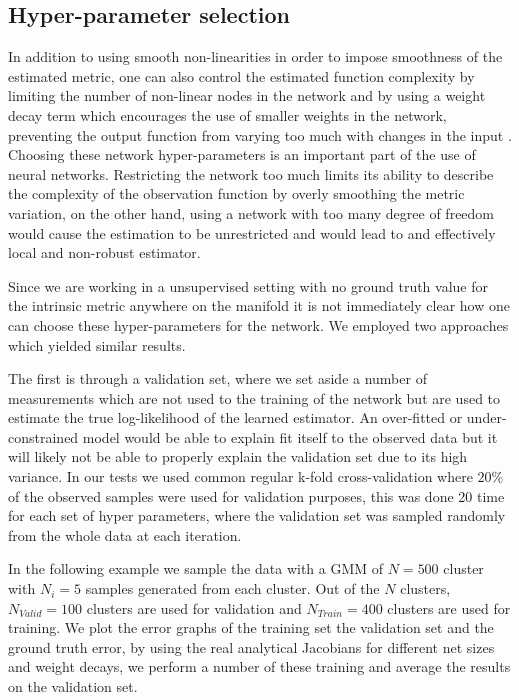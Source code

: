 	\subsection{Hyper-parameter selection}
		\label{ssec:Hyper-parameter-selection-and}
		
	In addition to using smooth non-linearities in order to impose smoothness of the estimated metric, one can also control the estimated function complexity by limiting the number of non-linear nodes in the network and by using a weight decay term which encourages the use of smaller weights in the network, preventing the output function from varying too much with changes in the input \cite{krogh1991simple}. Choosing these network hyper-parameters is an important part of the use of neural networks. Restricting the network too much limits its ability to describe the complexity of the observation function by overly smoothing the metric variation, on the other hand, using a network with too many degree of freedom would cause the estimation to be unrestricted and would lead to and effectively local and non-robust estimator.
	
	Since we are working in a unsupervised setting with no ground truth value for the intrinsic metric anywhere on the manifold it is not immediately clear how one can choose these hyper-parameters for the network. We employed two approaches which yielded similar results. 
	
	The first is through a validation set, where we set aside a number of measurements which are not used to the training of the network but are used to estimate the true log-likelihood of the learned estimator. An over-fitted or under-constrained model would be able to explain
	fit itself to the observed data but it will likely not be able to properly explain the validation set due to its high variance. In our tests we used common regular k-fold cross-validation where $20\%$ of the observed samples were used for validation purposes, this was done 20 time for each set of hyper parameters, where the validation set was sampled randomly from the whole data at each iteration.
	
	In the following example we sample the data with a \ac{GMM} of $N=500$ cluster with $N_{i}=5$ samples generated from each cluster. Out of the $N$ clusters, $N_{Valid}=100$ clusters are used for validation and $N_{Train}=400$ clusters are used for training. We plot the error graphs of the training set the validation set and the ground truth error, by using the real analytical Jacobians for different net sizes and weight decays, we perform a number of these training and average the results on the validation set. 
	

